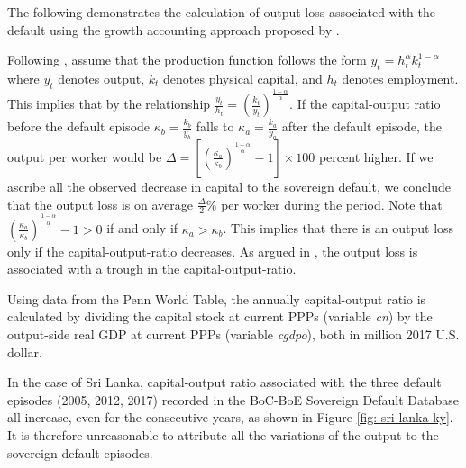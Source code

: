 The following demonstrates the calculation of output loss associated with the default using the growth accounting approach proposed by \citet{zarazaga-12}.

Following \citet{zarazaga-12}, assume that the production function follows the form $y_t = h^\alpha_t k^{1-\alpha}_t$ where $y_t$ denotes output, $k_t$ denotes physical capital, and $h_t$ denotes employment.
This implies that by the relationship $\frac{y_t}{h_t} = \left( \frac{k_t}{y_t} \right)^{\frac{1-\alpha}{\alpha}}$. If the capital-output ratio before the default episode $\kappa_b =\frac{k_b}{y_b}$ falls to $\kappa_a = \frac{k_{a}}{y_a}$ after the default episode, the output per worker would be
$\Delta = \left[\left(\frac{\kappa_a}{\kappa_b} \right)^{\frac{1-\alpha}{\alpha}} -1\right]\times 100$ percent higher.
If we ascribe all the observed decrease in capital to the sovereign default, we conclude that the output loss is on average $\frac{\Delta}{2} \%$ per worker during the period.
Note that $\left(\frac{\kappa_a}{\kappa_b} \right)^{\frac{1-\alpha}{\alpha}} -1 > 0$ if and only if $\kappa_a > \kappa_b$. This implies that there is an output loss only if the capital-output-ratio decreases. As argued in \citet{zarazaga-12}, the output loss is associated with a trough in the capital-output-ratio.

Using data from the Penn World Table, the annually capital-output ratio is calculated by dividing the capital stock at current PPPs (variable \emph{cn}) by the output-side real GDP at current PPPs (variable \emph{cgdpo}), both in million 2017 U.S. dollar.

In the case of Sri Lanka, capital-output ratio associated with the three default episodes (2005, 2012, 2017) recorded in the BoC-BoE Sovereign Default Database all increase, even for the consecutive years, as shown in Figure \ref{fig: sri-lanka-ky}. It is therefore unreasonable to attribute all the variations of the output to the sovereign default episodes.

